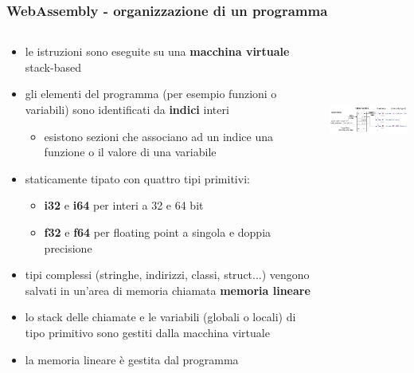 \documentclass{beamer}
\newcommand\Fontvi{\fontsize{9.5}{7.2}\selectfont}
\begin{document}
\begin{frame}
  \frametitle{WebAssembly - organizzazione di un programma}
  \begin{columns}
    \Fontvi
    \begin{column}{0.6\textwidth}
  \begin{itemize}
    \item le istruzioni sono eseguite su una \textbf{macchina virtuale} stack-based
    \item gli elementi del programma (per esempio funzioni o variabili) sono
      identificati da \textbf{indici} interi
    \begin{itemize}
      \item esistono sezioni che associano ad un indice una funzione o il
        valore di una variabile 
    \end{itemize}
    \item staticamente tipato con quattro tipi primitivi: 
      \begin{itemize}
        \item \textbf{i32} e \textbf{i64} per interi a 32 e 64 bit
        \item \textbf{f32} e \textbf{f64} per floating point a singola e doppia precisione
      \end{itemize}
    \item tipi complessi (stringhe, indirizzi, classi, struct...) vengono
      salvati in un'area di memoria chiamata \textbf{memoria lineare}
    \item lo stack delle chiamate e le variabili (globali o locali) di tipo
      primitivo sono gestiti dalla macchina virtuale
    \item la memoria lineare è gestita dal programma
  \end{itemize} 
  \end{column}
    \begin{column}{0.4\textwidth}
  \centerline{\includegraphics[width=5cm,height=5cm,keepaspectratio]{images/ftable.png}}
  \newline\newline\newline\newline

\end{column}
\end{columns}
\end{frame}
\end{document}
